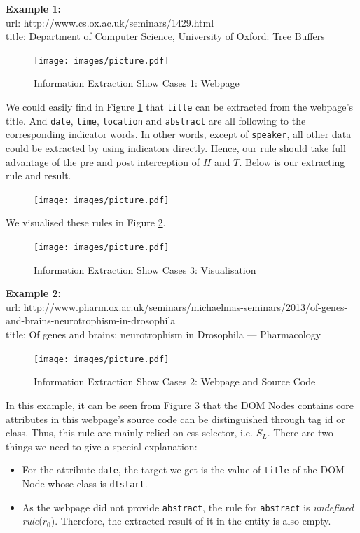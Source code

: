 \noindent \textbf{Example 1:}\\
url: http://www.cs.ox.ac.uk/seminars/1429.html\\
title: Department of Computer Science, University of Oxford: Tree Buffers
\begin{figure}[htbp!]
	\centering
	\texttt{[image: images/picture.pdf]}
	\caption{Information Extraction Show Cases 1: Webpage}\label{fig:ie_case_1b}
\end{figure}

We could easily find in Figure \ref{fig:ie_case_1b} that \texttt{title} can be extracted from the webpage's title. And \texttt{date}, \texttt{time}, \texttt{location} and \texttt{abstract} are all following to the corresponding indicator words. In other words, except of \texttt{speaker}, all other data could be extracted by using indicators directly. Hence, our rule should take full advantage	of the pre and post interception of $H$ and $T$. Below is our extracting rule and result.

\begin{figure}[htbp!]
	\centering
	\texttt{[image: images/picture.pdf]}
\end{figure}

We visualised these rules in Figure \ref{fig:ie_case_1v}.
\begin{figure}[H]
	\centering
	\texttt{[image: images/picture.pdf]}
	\caption{Information Extraction Show Cases 3: Visualisation}\label{fig:ie_case_1v}
\end{figure}


\noindent \textbf{Example 2:}\\
url: http://www.pharm.ox.ac.uk/seminars/michaelmas-seminars/2013/of-genes-and-brains-neurotrophism-in-drosophila\\
title: Of genes and brains: neurotrophism in Drosophila — Pharmacology\\

\begin{figure}[htbp!]
	\centering
	\texttt{[image: images/picture.pdf]}
	\caption{Information Extraction Show Cases 2: Webpage and Source Code}\label{fig:ie_case_2b}
\end{figure}

In this example, it can be seen from Figure \ref{fig:ie_case_2b} that the DOM Nodes contains core attributes in this webpage's source code can be distinguished through tag id or class. Thus, this rule are mainly relied on css selector, i.e. $S_L$. There are two things we need to give a special explanation:
\begin{itemize}
	\item For the attribute \texttt{date}, the target we get is the value of \texttt{title} of the DOM Node whose class is \texttt{dtstart}.
	\item As the webpage did not provide \texttt{abstract}, the rule for \texttt{abstract} is \textit{undefined rule}($r_0$). Therefore, the extracted result of it in the entity is also empty.
\end{itemize}

